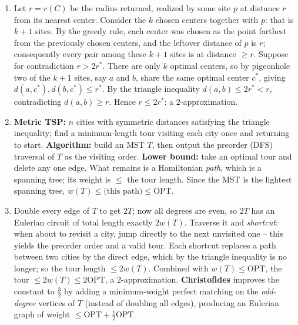 \documentclass[11pt]{article}
\begin{document}
\begin{enumerate}[label=\textbf{A\arabic*.}, leftmargin=2.2em]
\item Let $r = r(C)$ be the radius returned, realized by some site $p$ at distance $r$ from
its nearest center. Consider the $k$ chosen centers together with $p$: that is $k+1$ sites.
By the greedy rule, each center was chosen as the point farthest from the previously chosen
centers, and the leftover distance of $p$ is $r$; consequently every pair among these
$k+1$ sites is at distance $\ge r$. Suppose for contradiction $r > 2r^\ast$. There are
only $k$ optimal centers, so by pigeonhole two of the $k+1$ sites, say $a$ and $b$, share
the same optimal center $c^\ast$, giving $d(a,c^\ast), d(b,c^\ast) \le r^\ast$. By the
triangle inequality $d(a,b) \le 2r^\ast < r$, contradicting $d(a,b) \ge r$. Hence $r \le
2r^\ast$: a $2$-approximation.

\item \textbf{Metric TSP:} $n$ cities with symmetric distances satisfying the triangle
inequality; find a minimum-length tour visiting each city once and returning to start.
\textbf{Algorithm:} build an MST $T$, then output the preorder (DFS) traversal of $T$ as
the visiting order. \textbf{Lower bound:} take an optimal tour and delete any one edge.
What remains is a Hamiltonian \emph{path}, which is a spanning tree; its weight is $\le$
the tour length. Since the MST is the lightest spanning tree, $w(T) \le \text{(this path)}
\le \mathrm{OPT}$.

\item Double every edge of $T$ to get $2T$; now all degrees are even, so $2T$ has an
Eulerian circuit of total length exactly $2w(T)$. Traverse it and \emph{shortcut}: when
about to revisit a city, jump directly to the next unvisited one -- this yields the
preorder order and a valid tour. Each shortcut replaces a path between two cities by the
direct edge, which by the triangle inequality is no longer; so the tour length $\le 2w(T)$.
Combined with $w(T) \le \mathrm{OPT}$, the tour $\le 2w(T) \le 2\mathrm{OPT}$, a
$2$-approximation. \textbf{Christofides} improves the constant to $\frac32$ by adding a
minimum-weight perfect matching on the \emph{odd-degree} vertices of $T$ (instead of
doubling all edges), producing an Eulerian graph of weight $\le \mathrm{OPT} +
\frac12\mathrm{OPT}$.


\end{enumerate}
\end{document}
